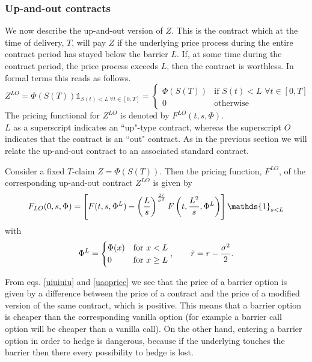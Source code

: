 \subsubsection{Up-and-out contracts}
We now describe the up-and-out version of $Z$. This is the contract which at the time of delivery, $T$, will pay $Z$ if the underlying price process during the entire contract period has stayed below the barrier $L$. If, at some time during the contract period, the price process exceeds $L$, then the contract is worthless. In formal terms this reads as follows.
\begin{equation}
    Z^{LO} = \Phi(S(T))\mathds{1}_{S(t)<L\,\forall t\in[0,T]} =
    \begin{cases}
    \Phi(S(T)) & \text{if } S(t)<L\,\,\forall t\in[0,T] \\
    0 & \text{otherwise}
    \end{cases}
\end{equation}
The pricing functional for $Z^{LO}$ is denoted by $F^{LO}(t,s,\Phi)$.\\
$L$ as a superscript indicates an ``up"-type contract, whereas the superscript $O$ indicates that the contract is an ``out" contract. As in the previous section we will relate the up-and-out contract to an associated standard contract.
\begin{theorem}
    Consider a fixed $T$-claim $Z = \Phi(S(T))$. Then the pricing function, $F^{LO}$, of the corresponding up-and-out contract $Z^{LO}$ is given by
    \begin{equation}\label{uaoprice}
        F_{LO}(0,s,\Phi) =
        \left[F(t,s,\Phi^L) - \left(\dfrac{L}{s}\right)^{\frac{2\Tilde{r}}{\sigma^2}}F\left(t,\frac{L^2}{s},\Phi^L\right)\right]\mathds{1}_{s<L}
    \end{equation}
    with
    \begin{equation}
        \Phi^L =
        \begin{cases}
        \Phi(x) & \text{for }x<L \\
        0 & \text{for }x\ge L
        \end{cases},
        \qquad \Tilde{r} = r - \frac{\sigma^2}{2}.
    \end{equation}
\end{theorem}
\begin{remark}
    From eqs. \eqref{uiuiuiu} and \eqref{uaoprice} we see that the price of a barrier option is given by a difference between the price of a contract and the price of a modified version of the same contract, which is positive. This means that a barrier option is cheaper than the corresponding vanilla option (for example a barrier call option will be cheaper than a vanilla call). On the other hand, entering a barrier option in order to hedge is dangerous, because if the underlying touches the barrier then there every possibility to hedge is lost.
\end{remark}

